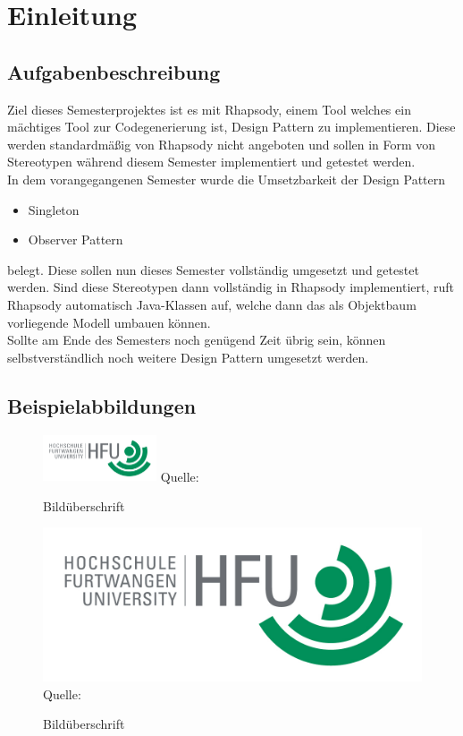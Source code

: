 \chapter{Einleitung}

\section{Aufgabenbeschreibung}

Ziel dieses Semesterprojektes ist es mit Rhapsody, einem Tool welches ein mächtiges Tool zur Codegenerierung ist, Design Pattern zu implementieren. Diese werden standardmäßig von Rhapsody nicht angeboten und sollen in Form von Stereotypen während diesem Semester implementiert und getestet werden.
\\
In dem vorangegangenen Semester wurde die Umsetzbarkeit der Design Pattern
\begin{itemize}
\item Singleton
\item Observer Pattern
\end{itemize}
belegt. Diese sollen nun dieses Semester vollständig umgesetzt und getestet werden. Sind diese Stereotypen dann vollständig in Rhapsody implementiert, ruft Rhapsody automatisch Java-Klassen auf, welche dann das als Objektbaum vorliegende Modell umbauen können.
\\
Sollte am Ende des Semesters noch genügend Zeit übrig sein, können selbstverständlich noch weitere Design Pattern umgesetzt werden. 

\newpage

\section{Beispielabbildungen}

\lipsum[10]

\begin{figure}
\caption{Bildüberschrift}
\centering
\includegraphics[width=0.3\textwidth]{content/pictures/hfu}
Quelle: \cite{s11wasml}
\label{pic:bild2}
\end{figure}

\lipsum[10]

\begin{figure}
\caption{Bildüberschrift}
\includegraphics[width=1\textwidth]{content/pictures/hfu}
Quelle: \cite{s11wasml}
\label{pic:bild1}
\end{figure}

